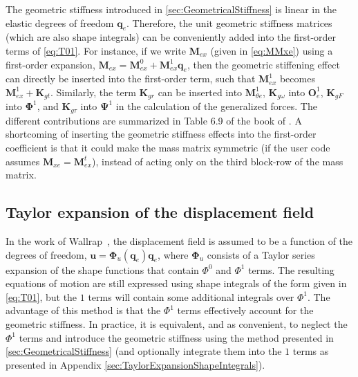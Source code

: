 \documentclass[wes, manuscript]{copernicus}
\renewcommand{\v}[1]{\boldsymbol{#1}}
\newcommand{\m}[1]{\boldsymbol{#1}}
\newcommand{\todoEmmanuel}[1]{{\colorbox{yellow}{TODO Emmanuel:}}{\color{red}{#1}}\colorbox{yellow}{/}}
\begin{document}
The geometric stiffness introduced in \autoref{sec:GeometricalStiffness} is linear in the elastic degrees of freedom $\v{q}_e$. 
Therefore, the unit geometric stiffness matrices (which are also shape integrals) can be conveniently added into the first-order terms of \autoref{eq:T01}. 
For instance, if we write $\m{M}_{ex}$ (given in \autoref{eq:MMxe}) using a first-order expansion, $\m{M}_{ex} = \m{M}_{ex}^0 + \m{M}_{ex}^1\v{q}_e$, then the geometric stiffening effect can directly be inserted into the first-order term, such that $\m{M}_{ex}^1$ becomes $\m{M}_{ex}^1+\m{K}_{gt}$.
Similarly, the term $\m{K}_{gr}$ can be inserted into $\m{M}_{\theta e}^1$, $\m{K}_{g\omega}$ into $\m{O}_e^1$, $\m{K}_{gF}$ into $\m{\Phi}^1$, and $\m{K}_{g\tau}$ into $\m{\Psi}^1$ in the calculation of the generalized forces. 
The different contributions are summarized in Table 6.9 of the book of \citet{Schwertassek:book}. A shortcoming of inserting the geometric stiffness effects into the first-order coefficient is that it could make the mass matrix symmetric (if the user code assumes $\m{M}_{xe}=\m{M}_{ex}^t$), instead of acting only on the third block-row of the mass matrix.

\subsection{Taylor expansion of the displacement field}
\label{sec:TaylorExpansionDisplacement}
In the work of Wallrap~\citep{Wallrapp:1993,Wallrapp:1994}, the displacement field is assumed to be a function of the degrees of freedom, $\v{u}=\m{\Phi}_u(\v{q}_e) \v{q}_e$, where $\m{\Phi}_u$ consists of a Taylor series expansion of the shape functions that contain $\Phi^0$ and $\Phi^1$ terms.
The resulting equations of motion are still expressed using shape integrals of the form given in \autoref{eq:T01}, but the $1$ terms will contain some additional integrals over $\Phi^1$. The advantage of this method is that the  $\Phi^1$ terms effectively account for the geometric stiffness. In practice, it is equivalent, and as convenient, to neglect the $\Phi^1$ terms and introduce the geometric stiffness using the method presented in \autoref{sec:GeometricalStiffness} (and optionally integrate them into the $1$ terms as presented in Appendix \ref{sec:TaylorExpansionShapeIntegrals}).

\end{document}
